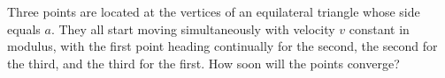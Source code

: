 
\item Three points are located at the vertices of an equilateral triangle whose side equals \(a\). They all start moving simultaneously with velocity \(v\) constant in modulus, with the first point heading continually for the second, the second for the third, and the third for the first. How soon will the points converge?
